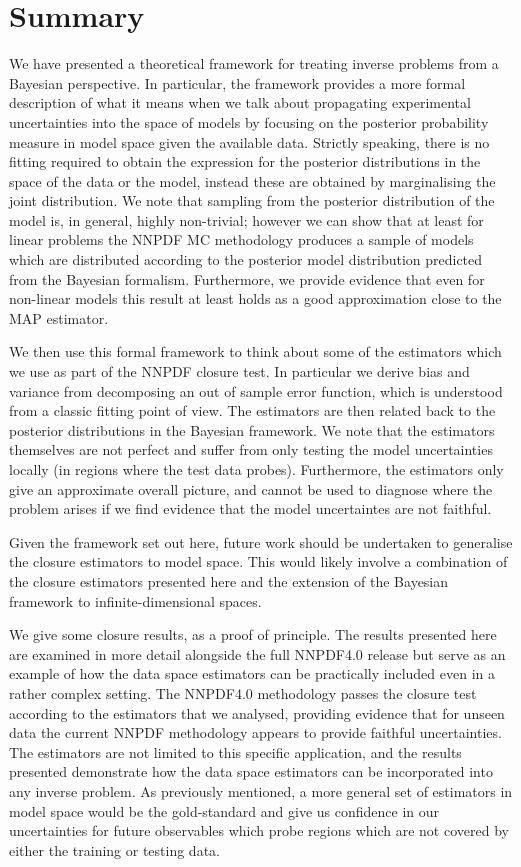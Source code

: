\section{Summary}

We have presented a theoretical framework for treating inverse problems from a
Bayesian perspective. In particular, the framework provides a more formal
description of what it means when we talk about propagating experimental
uncertainties into the space of models by focusing on the posterior probability
measure in model space given the available data. Strictly speaking, there is no
fitting required to obtain the expression for the posterior distributions in the
space of the data or the model, instead these are obtained by marginalising the
joint distribution. We note that sampling from the posterior distribution of the
model is, in general, highly non-trivial; however we can show that at least for
linear problems the NNPDF MC methodology produces a sample of models which are
distributed according to the posterior model distribution predicted from the
Bayesian formalism. Furthermore, we provide evidence that even for non-linear
models this result at least holds as a good approximation close to the MAP
estimator.

We then use this formal framework to think about some of the estimators which we
use as part of the NNPDF closure test. In particular we derive bias and variance
from decomposing an out of sample error function, which is understood from a
classic fitting point of view. The estimators are then related back to the
posterior distributions in the Bayesian framework. We note that the estimators
themselves are not perfect and suffer from only testing the model uncertainties
locally (in regions where the test data probes). Furthermore, the estimators
only give an approximate overall picture, and cannot be used to diagnose where
the problem arises if we find evidence that the model uncertaintes are not
faithful.

Given the framework set out here, future work should be undertaken to generalise
the closure estimators to model space. This would likely involve a combination
of the closure estimators presented here and the extension of the Bayesian
framework to infinite-dimensional spaces.

We give some closure results, as a proof of principle. The results
presented here are examined in more detail alongside the full NNPDF4.0
release \cite{NNPDF40} but serve as an example of how the data space
estimators can be practically included even in a rather complex setting. 
The NNPDF4.0 methodology
passes the closure test according to the estimators that we analysed, providing
evidence that for unseen data the current NNPDF methodology appears to provide
faithful uncertainties. The estimators are not limited to this specific
application, and the results presented demonstrate how the data space estimators
can be incorporated into any inverse problem. As previously mentioned, a more
general set of estimators in model space would be the gold-standard and give us
confidence in our uncertainties for future observables which probe regions which
are not covered by either the training or testing data.

